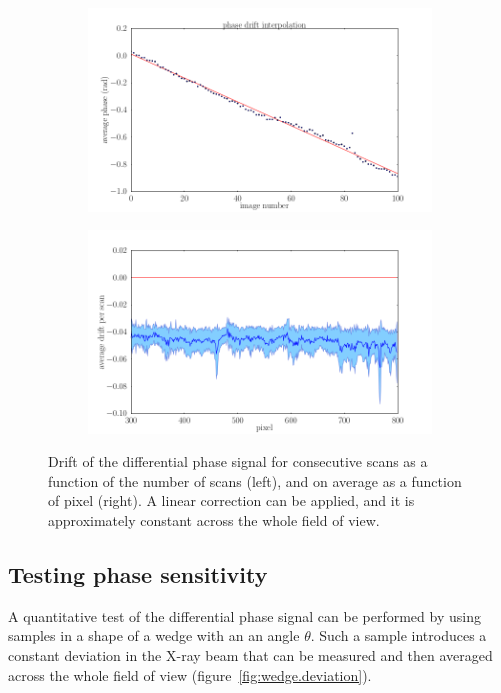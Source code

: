 \begin{figure}[htb]
    \centering
    \begin{subfigure}[b]{.49\textwidth}
        \includegraphics[width=\textwidth]{gfx/mythen-edge-on/drift_fit.png}
        \caption{}
    \end{subfigure}
    \begin{subfigure}[b]{.49\textwidth}
        \includegraphics[width=\textwidth]{gfx/mythen-edge-on/drift_pixels.png}
        \caption{}
    \end{subfigure}
    \caption{Drift of the differential phase signal for consecutive scans as
    a function of the number of scans (left), and on average as a function
of pixel (right). A linear correction can be applied, and it is
approximately constant across the whole field of view.}
\end{figure}

\subsection{Testing phase sensitivity}
A quantitative test of the differential phase signal can be performed by
using samples in a shape of a wedge with an an angle $\theta$. Such a sample
introduces a constant deviation in the X-ray beam that can be measured and
then averaged across the whole field of view
(figure~\ref{fig:wedge.deviation}).

